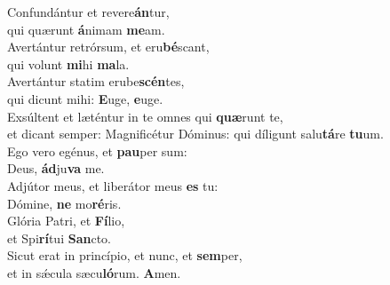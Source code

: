 \evenverse Confundántur et revere\textbf{án}tur,~\*\\
\evenverse qui quærunt \textbf{á}nimam \textbf{me}am.\\
\oddverse Avertántur retrórsum, et eru\textbf{bé}scant,~\*\\
\oddverse qui volunt \textbf{mi}hi \textbf{ma}la.\\
\evenverse Avertántur statim erube\textbf{scén}tes,~\*\\
\evenverse qui dicunt mihi: \textbf{E}uge, \textbf{e}uge.\\
\oddverse Exsúltent et læténtur in te omnes qui \textbf{quæ}runt te,~\*\\
\oddverse et dicant semper: Magnificétur Dóminus: qui díligunt salu\textbf{tá}re \textbf{tu}um.\\
\evenverse Ego vero egénus, et \textbf{pau}per sum:~\*\\
\evenverse Deus, \textbf{ád}ju\textbf{va} me.\\
\oddverse Adjútor meus, et liberátor meus \textbf{es} tu:~\*\\
\oddverse Dómine, \textbf{ne} mo\textbf{ré}ris.\\
\evenverse Glória Patri, et \textbf{Fí}lio,~\*\\
\evenverse et Spi\textbf{rí}tui \textbf{San}cto.\\
\oddverse Sicut erat in princípio, et nunc, et \textbf{sem}per,~\*\\
\oddverse et in sǽcula sæcu\textbf{ló}rum. \textbf{A}men.\\
